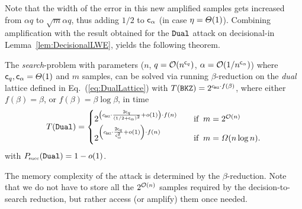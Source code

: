 Note that the width of the error in this new amplified \LWE samples gets increased from $\alpha q$ to $\sqrt{m} \alpha q$, thus adding $1/2$ to $\mathsf{c}_{\alpha}$ (in case $\eta = \varTheta(1)$). Combining amplification with the result obtained for the $\texttt{Dual}$ attack on decisional-\LWE in Lemma~\ref{lem:DecisionalLWE}, yields the following theorem. 

\begin{thm} \label{thm:DualSearch} The \emph{search}-\LWE problem with parameters ($n$, $q=\mathcal{O}(n^{\mathsf{c}_q})$, $\alpha = \mathcal{O}(1 / n^{\mathsf{c}_{\alpha}})$) where $\mathsf{c}_q, \mathsf{c}_{\alpha} = \varTheta(1)$ and $m$ \LWE samples, can be solved via running $\beta$-\BKZ reduction on the \emph{dual} lattice defined in Eq.~(\ref{eq:DualLattice}) with $T(\BKZ) = 2^{\cBKZ \cdot f(\beta)}$, where either $f(\beta) = \beta$, or $f(\beta) = \beta \log \beta$, in time
\[
		T(\DUAL) = \begin{cases}
			2^{\left( \cBKZ \cdot \frac{2\cq}{(1/2+\ca)^2} + \smallo(1) \right) \cdot f(n)} \quad &  \text{if} \;\; m = 2^{\bigO(n)} \\
			2^{\left( \cBKZ \cdot \frac{2\cq}{\ca^2} + \smallo(1) \right) \cdot f(n)} \quad & \text{if} \;\; m = \WLandau(n \log n).
		\end{cases}
\]
with $P\mkern-4mu_{\mbox{\tiny succ}}(\texttt{Dual}) = 1- o(1)$.
\end{thm}

The memory complexity of the attack is determined by the $\beta$-\BKZ reduction. Note that we do not have to store all the $2^{\mathcal{O}(n)}$ \LWE samples required by the decision-to-search reduction, but rather access (or amplify) them once needed. 